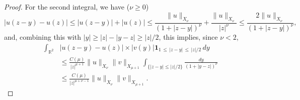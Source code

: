 \documentclass[AHL,Unicode,longabstracts,published]{cedram}
\newcommand*\R{\mathbb R}
\newcommand{\bfun}{\mathbf{1}}
\newcommand*\gs{\geqslant }
\newcommand*\ls{\leqslant }
\begin{document}
\begin{proof}
For the second integral, we have ($\nu \gs 0 $)
\[
\lvert u (z-y) - u (z) \rvert
\ls \lvert u (z-y) \rvert + \lvert u (z) \rvert
\ls \frac{ \| u \|_{X_\nu} }{ (1 + |z-y|)^\nu } + \frac{\| u \|_{X_\nu} }{ |z|^\nu }
\ls \frac{2\| u \|_{X_\nu}}{ (1+ |z-y|)^\nu },
\]
and, combining this with $|y| \gs |z| - |y-z| \gs |z| /2 $, this implies, since $ \nu < 2 $,
\begin{align*}
\int_{\R^2} & \lvert u (z-y) - u (z) \rvert \times \lvert v(y) \rvert \bfun_{ 1\,\ls\,|z-y| \,\ls\,|z|/2 } \, dy
\\ & \ls \frac{C(\mu) }{ |z|^{\mu+1} } \| u \|_{X_\nu} \| v \|_{ X_{\mu+1} }
\int_{ \{ |z-y| \ls |z|/2 \} } \frac{dy}{ (1 + |y -z|)^\nu }
\\
& \ls \frac{C(\mu)}{ |z|^{ \mu + \nu - 1 } } \| u \|_{X_\nu} \| v \|_{ X_{\mu+1}}.
\end{align*}


\end{proof}
\end{document}
